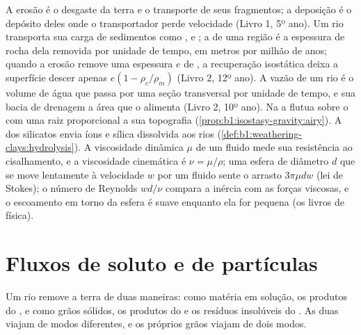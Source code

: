 \begin{recall}
A erosão é o desgaste da terra e o transporte de seus fragmentos; a deposição é o depósito deles onde o transportador perde velocidade (Livro 1, 5º ano). Um rio transporta sua carga de sedimentos como ,  e ; a  de uma região é a espessura de rocha dela removida por unidade de tempo, em metros por milhão de anos; quando a erosão remove uma espessura $e$ de , a recuperação isostática deixa a superfície descer apenas $e(1 - \rho_c/\rho_m)$ (Livro 2, 12º ano). A vazão de um rio é o volume de água que passa por uma seção transversal por unidade de tempo, e sua bacia de drenagem a área que o alimenta (Livro 2, 10º ano). Na  a  flutua sobre o  com uma raiz proporcional a sua topografia (\cref{prop:b1:isostasy-gravity:airy}). A  dos silicatos envia íons e sílica dissolvida aos rios (\cref{def:b1:weathering-clays:hydrolysis}). A viscosidade dinâmica $\mu$ de um fluido mede sua resistência ao cisalhamento, e a viscosidade cinemática é $\nu = \mu/\rho$; uma esfera de diâmetro $d$ que se move lentamente à velocidade $w$ por um fluido sente o arrasto $3\pi\mu d w$ (lei de Stokes); o número de Reynolds $w d/\nu$ compara a inércia com as forças viscosas, e o escoamento em torno da esfera é suave enquanto ela for pequena (os livros de física).
\end{recall}

\section{Fluxos de soluto e de partículas}\label{sec:b1:erosion-transport:fluxes}

Um rio remove a terra de duas maneiras: como matéria em solução, os produtos do , e como grãos sólidos, os produtos do  e os resíduos insolúveis do . As duas viajam de modos diferentes, e os próprios grãos viajam de dois modos.

